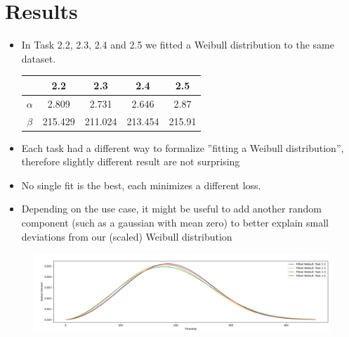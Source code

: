\documentclass[10pt,aspectratio=169,handout]{beamer}
\begin{document}
\section{Results}

\begin{itemize}
    \item In Task 2.2, 2.3, 2.4 and 2.5 we fitted a Weibull distribution to the same dataset.

    \begin{tabular}{|c|c|c|c|c|}
        \hline
        & 2.2 & 2.3 & 2.4 & 2.5\\ \hline 
        $\alpha$ & 2.809 & 2.731 & 2.646 & 2.87\\\hline
        $\beta$ & 215.429 & 211.024 & 213.454 & 215.91\\\hline
    \end{tabular}
    \item Each task had a different way to formalize ''fitting a Weibull distribution'', therefore slightly different result are not surprising
    \item No single fit is the best, each minimizes a different loss. 
    \item Depending on the use case, it might be useful to add another random component (such as a gaussian with mean zero) to better explain small deviations from our (scaled) Weibull distribution  
\end{itemize}
\begin{figure}
    \includegraphics[width=\textwidth]{images/fitted_weibulls.png}
\end{figure}
\end{document}
